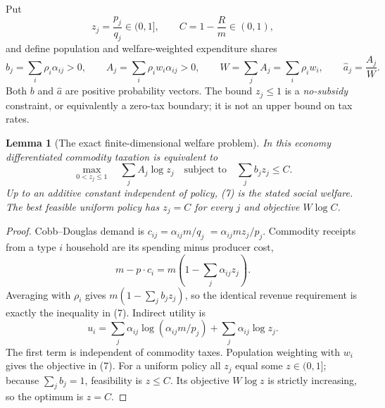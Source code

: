 \documentclass[11pt]{article}
\newtheorem{lemma}{Lemma}
\theoremstyle{definition}
\begin{document}
Put
\[
 z_j=\frac{p_j}{q_j}\in(0,1],\qquad C=1-\frac Rm\in(0,1),
\]
and define population and welfare-weighted expenditure shares
\[
 b_j=\sum_i\rho_i\alpha_{ij}>0,\qquad
 A_j=\sum_i\rho_iw_i\alpha_{ij}>0,\qquad
 W=\sum_j A_j=\sum_i\rho_iw_i,
 \qquad \widehat a_j=\frac{A_j}{W}.
\]
Both $b$ and $\widehat a$ are positive probability vectors. The bound
$z_j\leq1$ is a \emph{no-subsidy} constraint, or equivalently a
zero-tax boundary; it is not an upper bound on tax rates.

\begin{lemma}[The exact finite-dimensional welfare problem]
In this economy differentiated commodity taxation is equivalent to
\[
 \max_{0<z_j\leq1}\quad \sum_j A_j\log z_j
 \quad\text{subject to}\quad\sum_j b_jz_j\leq C.             \tag{7}
\]
Up to an additive constant independent of policy, (7) is the stated
social welfare. The best feasible uniform policy has $z_j=C$ for
every $j$ and objective $W\log C$.
\end{lemma}
\begin{proof}
Cobb--Douglas demand is $c_{ij}=\alpha_{ij}m/q_j$
$=\alpha_{ij}mz_j/p_j$. Commodity receipts from a type $i$ household
are its spending minus producer cost,
\[
 m-p\cdot c_i=m\left(1-\sum_j\alpha_{ij}z_j\right).
\]
Averaging with $\rho_i$ gives $m(1-\sum_jb_jz_j)$, so the identical
revenue requirement is exactly the inequality in (7). Indirect utility
is
\[
 u_i=\sum_j\alpha_{ij}\log(\alpha_{ij}m/p_j)
                 +\sum_j\alpha_{ij}\log z_j.
\]
The first term is independent of commodity taxes. Population weighting
with $w_i$ gives the objective in (7). For a uniform policy all $z_j$
equal some $z\in(0,1]$; because $\sum_jb_j=1$, feasibility is $z\leq C$.
Its objective $W\log z$ is strictly increasing, so the optimum is $z=C$.
\end{proof}
\end{document}

